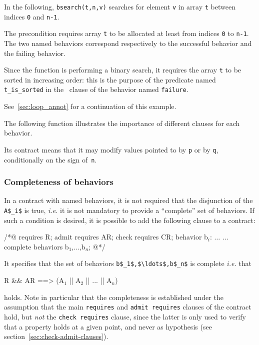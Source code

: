 \begin{example}
\label{ex:bsearch}
In the following, \lstinline|bsearch(t,n,v)| searches for element \lstinline|v|
in array \lstinline|t| between indices \lstinline|0| and \lstinline|n-1|.

%
The precondition requires array \lstinline|t| to be allocated at least
from indices \lstinline|0|
to \lstinline|n-1|. The two named behaviors
correspond respectively to the successful behavior and the failing
behavior.

Since the function is performing a binary search, it requires the
array \lstinline|t| to be sorted in increasing order: this is the purpose of
the predicate named \lstinline|t_is_sorted| in the \assumes\ clause of the
behavior named \lstinline|failure|.

See~\ref{sec:loop_annot} for a continuation of this example.
\end{example}

\begin{example}
  The following function illustrates the importance of different
  \assigns{} clauses for each behavior.

%
  Its contract means that it may modify values pointed to by
  \lstinline|p| or by \lstinline|q|,
  conditionally on the sign of~\lstinline|n|.
\end{example}


\subsubsection{Completeness of behaviors}
\label{sec:compl-behav}
In a contract with named behaviors, it is not required that
the disjunction of the \lstinline|A$_i$| is true, \emph{i.e.} it is not
mandatory to provide a ``complete'' set of behaviors.
If such a condition is desired, it is possible to add the following clause
to a contract:
\begin{listing-nonumber}
/*@ requires R;
    admit requires AR;
    check requires CR;
    behavior b$_i$: $\dots$
    $\dots$
    complete behaviors b$_1$,$\dots$,b$_n$;
  @*/
\end{listing-nonumber}
It specifies that the set of behaviors \lstinline|b$_1$,$\ldots$,b$_n$|
is complete \emph{i.e.} that
\begin{listing-nonumber}
R && AR ==> (A$_1$ || A$_2$ || ... || A$_n$)
\end{listing-nonumber}
holds. Note in particular that the completeness is established under the assumption
that the main \lstinline|requires| and \lstinline|admit requires| clauses of the contract
hold, but \emph{not} the \lstinline|check requires| clause, since the latter is
only used to verify that a property holds at a given point, and never as hypothesis
(see section~\ref{sec:check-admit-clauses}).

